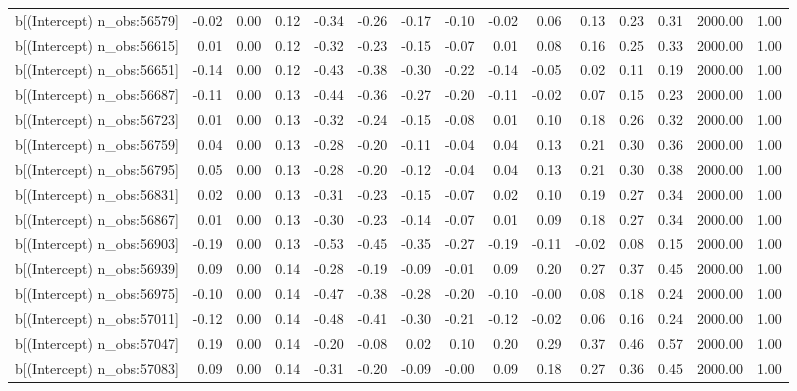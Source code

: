 \begin{table}[ht]
\begin{tabular}{rrrrrrrrrrrrrrr}
  b[(Intercept) n\_obs:56579] & -0.02 & 0.00 & 0.12 & -0.34 & -0.26 & -0.17 & -0.10 & -0.02 & 0.06 & 0.13 & 0.23 & 0.31 & 2000.00 & 1.00 \\ 
  b[(Intercept) n\_obs:56615] & 0.01 & 0.00 & 0.12 & -0.32 & -0.23 & -0.15 & -0.07 & 0.01 & 0.08 & 0.16 & 0.25 & 0.33 & 2000.00 & 1.00 \\ 
  b[(Intercept) n\_obs:56651] & -0.14 & 0.00 & 0.12 & -0.43 & -0.38 & -0.30 & -0.22 & -0.14 & -0.05 & 0.02 & 0.11 & 0.19 & 2000.00 & 1.00 \\ 
  b[(Intercept) n\_obs:56687] & -0.11 & 0.00 & 0.13 & -0.44 & -0.36 & -0.27 & -0.20 & -0.11 & -0.02 & 0.07 & 0.15 & 0.23 & 2000.00 & 1.00 \\ 
  b[(Intercept) n\_obs:56723] & 0.01 & 0.00 & 0.13 & -0.32 & -0.24 & -0.15 & -0.08 & 0.01 & 0.10 & 0.18 & 0.26 & 0.32 & 2000.00 & 1.00 \\ 
  b[(Intercept) n\_obs:56759] & 0.04 & 0.00 & 0.13 & -0.28 & -0.20 & -0.11 & -0.04 & 0.04 & 0.13 & 0.21 & 0.30 & 0.36 & 2000.00 & 1.00 \\ 
  b[(Intercept) n\_obs:56795] & 0.05 & 0.00 & 0.13 & -0.28 & -0.20 & -0.12 & -0.04 & 0.04 & 0.13 & 0.21 & 0.30 & 0.38 & 2000.00 & 1.00 \\ 
  b[(Intercept) n\_obs:56831] & 0.02 & 0.00 & 0.13 & -0.31 & -0.23 & -0.15 & -0.07 & 0.02 & 0.10 & 0.19 & 0.27 & 0.34 & 2000.00 & 1.00 \\ 
  b[(Intercept) n\_obs:56867] & 0.01 & 0.00 & 0.13 & -0.30 & -0.23 & -0.14 & -0.07 & 0.01 & 0.09 & 0.18 & 0.27 & 0.34 & 2000.00 & 1.00 \\ 
  b[(Intercept) n\_obs:56903] & -0.19 & 0.00 & 0.13 & -0.53 & -0.45 & -0.35 & -0.27 & -0.19 & -0.11 & -0.02 & 0.08 & 0.15 & 2000.00 & 1.00 \\ 
  b[(Intercept) n\_obs:56939] & 0.09 & 0.00 & 0.14 & -0.28 & -0.19 & -0.09 & -0.01 & 0.09 & 0.20 & 0.27 & 0.37 & 0.45 & 2000.00 & 1.00 \\ 
  b[(Intercept) n\_obs:56975] & -0.10 & 0.00 & 0.14 & -0.47 & -0.38 & -0.28 & -0.20 & -0.10 & -0.00 & 0.08 & 0.18 & 0.24 & 2000.00 & 1.00 \\ 
  b[(Intercept) n\_obs:57011] & -0.12 & 0.00 & 0.14 & -0.48 & -0.41 & -0.30 & -0.21 & -0.12 & -0.02 & 0.06 & 0.16 & 0.24 & 2000.00 & 1.00 \\ 
  b[(Intercept) n\_obs:57047] & 0.19 & 0.00 & 0.14 & -0.20 & -0.08 & 0.02 & 0.10 & 0.20 & 0.29 & 0.37 & 0.46 & 0.57 & 2000.00 & 1.00 \\ 
  b[(Intercept) n\_obs:57083] & 0.09 & 0.00 & 0.14 & -0.31 & -0.20 & -0.09 & -0.00 & 0.09 & 0.18 & 0.27 & 0.36 & 0.45 & 2000.00 & 1.00 \\ 

\end{tabular}
\end{table}
